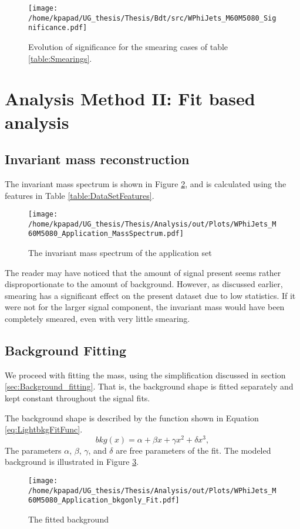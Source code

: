 \begin{figure}[h!]
\centering
\texttt{[image: /home/kpapad/UG\_thesis/Thesis/Bdt/src/WPhiJets\_M60M5080\_Significance.pdf]}
\caption{Evolution of significance for the smearing cases of table \ref{table:Smearings}. }
\label{fig:LightSigEvolBDT}
\end{figure}

\newpage
\section{Analysis Method II: Fit based analysis}
\label{sec:orgedb2280}
\label{sec:LightAnalysis_method2}
\subsection{Invariant mass reconstruction}
\label{sec:orgce79419}
\label{sec:Light_invariant_mass_reconstruction}
 The invariant mass spectrum is shown in Figure \ref{fig:LightAppMass}, and  is calculated using the features in Table \ref{table:DataSetFeatures}. 
\begin{figure}[h]
\centering
\texttt{[image: /home/kpapad/UG\_thesis/Thesis/Analysis/out/Plots/WPhiJets\_M60M5080\_Application\_MassSpectrum.pdf]}
\caption{The invariant mass spectrum of the application set}
\label{fig:LightAppMass}
\end{figure}

The reader may have noticed that the amount of signal present seems rather disproportionate to the amount of background. However, as discussed earlier, smearing has a significant effect on the present dataset due to low statistics. If it were not for the larger signal component, the invariant mass would have been completely smeared, even with very little smearing.
\subsection{Background Fitting}
\label{sec:orge8fa574}
\label{sec:Light_background_fitting}
We proceed with fitting the mass, using the simplification discussed in section \ref{sec:Background_fitting}. That is, the background shape is fitted separately and kept constant throughout the signal fits.

The background shape is described by the function shown in Equation \ref{eq:LightbkgFitFunc}.
\begin{equation}
bkg(x) =  \alpha + \beta x + \gamma x^2 + \delta x^3,
\label{eq:LightbkgFitFunc}
\end{equation}
The parameters \(\alpha\), \(\beta\), \(\gamma\), and \(\delta\) are free parameters of the fit. The modeled background is illustrated in Figure \ref{fig:LightBKGfit}.
\begin{figure}[h]
\centering
\texttt{[image: /home/kpapad/UG\_thesis/Thesis/Analysis/out/Plots/WPhiJets\_M60M5080\_Application\_bkgonly\_Fit.pdf]}
\caption{The fitted background}
\label{fig:LightBKGfit}
\end{figure}
